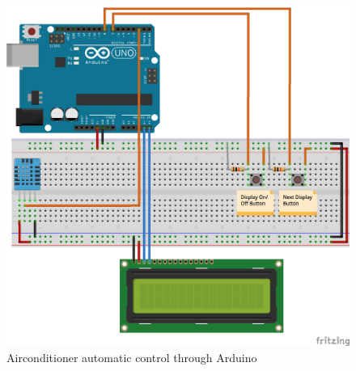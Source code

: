 \documentclass[conference]{IEEEtran}
\begin{document}
\begin{figure}[h]
\begin{center}
    \includegraphics[scale=0.4]{arduino}
    \caption{Airconditioner automatic control through Arduino} \label{fig:label}
\end{center}
\end{figure}
\end{document}
